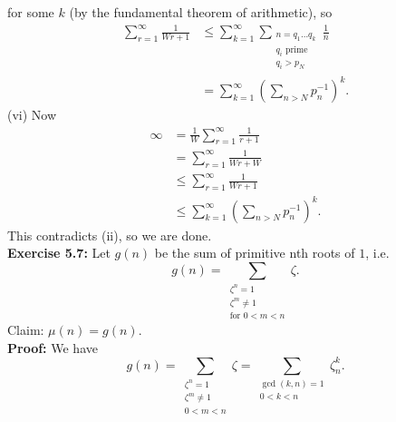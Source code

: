 \documentclass[a4paper]{article}
\begin{document}
for some $k$ (by the fundamental theorem of arithmetic), so
\begin{align*}
    \sum_{r=1}^{\infty} \frac{1}{Wr+1}
    &\le \sum_{k=1}^{\infty} 
    \sum_{\substack{n=q_1 \ldots q_k\\ q_i \text{ prime} \\ q_i > p_N}}
    \frac{1}{n}\\
    &= \sum_{k=1}^{\infty} \left( \sum_{n>N} p_n^{-1} \right)^{k}
.\end{align*}
(vi)   
Now 
\begin{align*}
    \infty 
    &= \frac{1}{W} \sum_{r=1}^{\infty} \frac{1}{r+1}\\
    &= \sum_{r=1}^{\infty} \frac{1}{Wr + W}\\
    &\le \sum_{r=1}^{\infty} \frac{1}{Wr+1}\\
    &\le \sum_{k=1}^{\infty} \left( \sum_{n>N} p_n^{-1} \right)^{k}
.\end{align*}
This contradicts (ii), so we are done.\\
\linebreak
\textbf{Exercise 5.7:} Let $g(n)$ be the sum of primitive nth roots of $1$,
i.e.
\[
    g(n) = \sum_{\substack{\zeta^{n}=1 \\ \zeta^{m}\neq 1\\ 
    \text{for } 0<m<n}} \zeta.
\] 
Claim: $\mu(n) = g(n)$.\\
\textbf{Proof:} We have
\[
    g(n) = \sum_{\substack{\zeta^{n}=1\\ \zeta^{m}\neq 1\\
    0 < m < n}} \zeta 
    = \sum_{\substack{\gcd(k,n)=1\\ 0<k<n}} \zeta_{n}^{k}.
\] 
\end{document}
